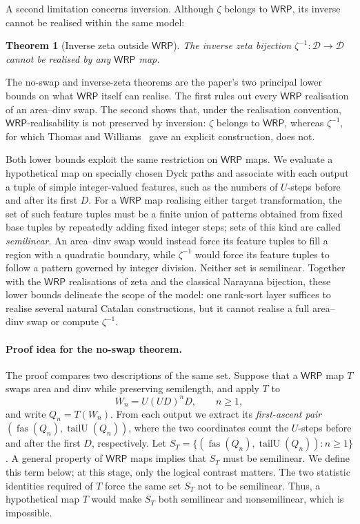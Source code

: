 \documentclass[11pt]{article}
\newtheorem{theorem}{Theorem}[section]
\theoremstyle{definition}
\newcommand{\D}{\mathcal D}
\newcommand{\WRP}{\mathsf{WRP}}
\newcommand{\fas}{\operatorname{fas}}
\newcommand{\tailU}{\operatorname{tailU}}
\begin{document}
A second limitation concerns inversion.  Although $\zeta$ belongs to $\WRP$,
its inverse cannot be realised within the same model:
\begin{theorem}[Inverse zeta outside $\WRP$]
\label{thm:intro-inverse-zeta}
The inverse zeta bijection $\zeta^{-1}\colon\D\to\D$ cannot be realised by any
$\WRP$ map.
\end{theorem}

The no-swap and inverse-zeta theorems are the paper's two principal lower
bounds on what $\WRP$ itself can realise.  The first rules out every $\WRP$
realisation of an area--dinv swap.  The second shows that, under the
realisation convention, $\WRP$-realisability is not preserved by inversion:
$\zeta$ belongs to $\WRP$, whereas $\zeta^{-1}$, for which Thomas and
Williams~\cite{ThomasWilliams2018} gave an explicit construction, does not.

Both lower bounds exploit the same restriction on $\WRP$ maps.  We evaluate a
hypothetical map on specially chosen Dyck paths and associate with each output
a tuple of simple integer-valued features, such as the numbers of
$U$-steps before and after its first $D$.  For a $\WRP$ map realising either
target transformation, the set of such feature tuples must be a finite union
of patterns obtained from fixed base tuples by repeatedly adding fixed integer
steps; sets of this kind are called \emph{semilinear}.  An area--dinv swap
would instead force its feature tuples to fill a region with a quadratic
boundary, while $\zeta^{-1}$ would force its feature tuples to follow a
pattern governed by integer division.  Neither set is semilinear.  Together
with the $\WRP$ realisations of zeta and the classical Narayana bijection,
these lower bounds delineate the scope of the model: one rank-sort layer
suffices to realise several natural Catalan constructions, but it cannot
realise a full area--dinv swap or compute $\zeta^{-1}$.

\paragraph{Proof idea for the no-swap theorem.}

The proof compares two descriptions of the same set.  Suppose that a $\WRP$
map $T$ swaps area and dinv while preserving semilength, and apply $T$ to
\[
   W_n=U(UD)^nD,\qquad n\ge 1,
\]
and write $Q_n=T(W_n)$.  From each output we extract its \emph{first-ascent
pair} $(\fas(Q_n),\tailU(Q_n))$, where the two coordinates count the $U$-steps
before and after the first $D$, respectively.  Let
$S_T=\{(\fas(Q_n),\tailU(Q_n)):n\ge 1\}$.
A general property of $\WRP$ maps implies that $S_T$ must be semilinear.
We define this term below; at this stage, only the logical contrast matters.
The two statistic identities required of $T$ force the same set $S_T$ not to
be semilinear.  Thus, a hypothetical map $T$ would make $S_T$ both semilinear
and nonsemilinear, which is impossible.
\end{document}
